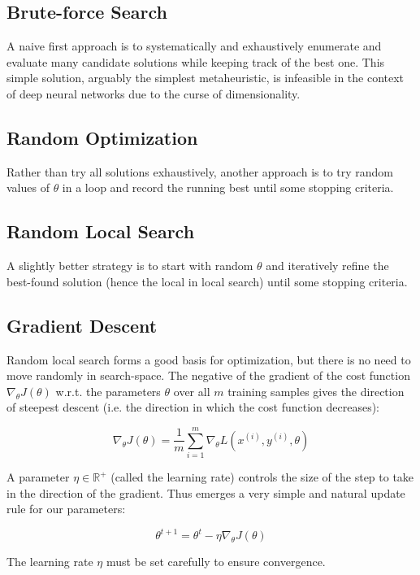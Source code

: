 \subsection{Brute-force Search}

A naive first approach is to systematically and exhaustively enumerate and evaluate many candidate solutions while keeping track of the best one. This simple solution, arguably the simplest metaheuristic, is infeasible in the context of deep neural networks due to the curse of dimensionality.

\subsection{Random Optimization}

Rather than try all solutions exhaustively, another approach is to try random values of $\theta$ in a loop and record the running best until some stopping criteria.

\subsection{Random Local Search}

A slightly better strategy is to start with random $\theta$ and iteratively refine the best-found solution (hence the local in local search) until some stopping criteria.

\subsection{Gradient Descent}

Random local search forms a good basis for optimization, but there is no need to move randomly in search-space. The negative of the gradient of the cost function $\nabla_{\theta} J(\theta)$ w.r.t. the parameters $\theta$ over all $m$ training samples gives the direction of steepest descent (i.e. the direction in which the cost function decreases):

$$
\nabla_{\theta} J(\theta) = \frac{1}{m} \sum_{i=1}^{m} \nabla_{\theta} L(x^{(i)}, y^{(i)}, \theta)
$$

A parameter $\eta \in \mathbb{{R}^{+}}$ (called the learning rate) controls the size of the step to take in the direction of the gradient. Thus emerges a very simple and natural update rule for our parameters:

$$
\theta^{t+1} = \theta^t - \eta \nabla_{\theta} J(\theta)
$$

The learning rate $\eta$ must be set carefully to ensure convergence.

